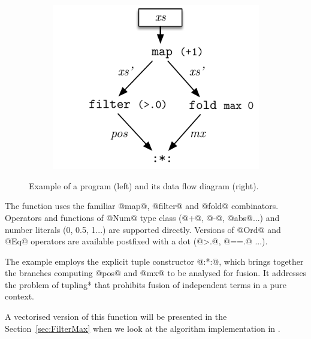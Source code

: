 \documentclass[preamble.tex]{subfiles}
\begin{document}
\begin{figure}
\begin{subfigure}{0.5\textwidth}
\end{subfigure}
%
\begin{subfigure}{.5\textwidth}%
\includegraphics[center,scale=\omniscale]{img/DFD-Flat-FilterMax}%
\end{subfigure}%

\caption{Example of a \LiveFusion program (left) and its data flow diagram (right).}
\label{fig:Flat-FilterMax}
\end{figure}

The function uses the familiar @map@, @filter@ and @fold@ combinators. Operators and functions of @Num@ type class (@+@, @-@, @abs@...) and number literals (0, 0.5, 1...) are supported directly. Versions of @Ord@ and @Eq@ operators are available postfixed with a dot (@>.@, @==.@ ...).

The example employs the explicit tuple constructor @:*:@, which brings together the branches computing @pos@ and @mx@ to be analysed for fusion. It addresses the problem of \*tupling* that prohibits fusion of independent terms in a pure context.

A vectorised version of this function will be presented in the Section~\ref{sec:FilterMax} when we look at the \QuickHull algorithm implementation in \DPH.
\end{document}

